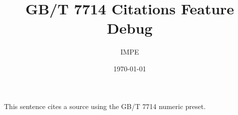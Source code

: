 \documentclass[12pt]{article}
\title{GB/T 7714 Citations Feature Debug}
\author{IMPE}
\date{\today}
\begin{document}
\maketitle

This sentence cites a source using the GB/T 7714 numeric preset\cite{sample2026}.

\printbibliography
\end{document}
